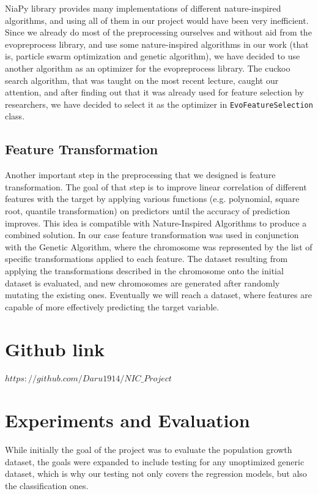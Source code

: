 \documentclass[conference]{IEEEtran}
\begin{document}
NiaPy library provides many implementations of different nature-inspired algorithms, and using all of them in our project would have been very inefficient. Since we already do most of the preprocessing ourselves and without aid from the evopreprocess library, and use some nature-inspired algorithms in our work (that is, particle swarm optimization and genetic algorithm), we have decided to use another algorithm as an optimizer for the evopreprocess library. The cuckoo search algorithm, that was taught on the most recent lecture, caught our attention, and after finding out that it was already used for feature selection by researchers\cite{aziz2018modified}\cite{rodrigues2013bcs}, we have decided to select it as the optimizer in \texttt{EvoFeatureSelection} class.\\ 

\subsection{Feature Transformation}

Another important step in the preprocessing that we designed is feature transformation. The goal of that step is to improve linear correlation of different features with the target by applying 
various functions (e.g. polynomial, square root, quantile transformation) on predictors until the accuracy of prediction improves. This idea is compatible with Nature-Inspired Algorithms to produce a combined solution. In our case feature transformation was used in conjunction with the Genetic Algorithm, where the chromosome was represented by the list of specific transformations applied to each feature. The dataset resulting from applying the transformations described in the chromosome onto the initial dataset is evaluated, and new chromosomes are generated after randomly mutating the existing ones. Eventually we will reach a dataset, where features are capable of more effectively predicting the target variable. 

\section{Github link}
$https://github.com/Daru1914/NIC\_Project$

\section{Experiments and Evaluation}

While initially the goal of the project was to evaluate the population growth dataset, the goals were expanded to include testing for any unoptimized generic dataset, which is why our testing not only covers the regression models, but also the classification ones.
\end{document}
